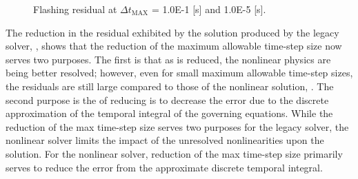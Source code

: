 \begin{figure}[h!t]
\centering
{}
\caption[Flashing residual at $\Delta t_{\text{MAX}}$ = 1.0E-1 {[s]}and 1.0E-5 {[s]}]{Flashing residual at $\Delta t_{\text{MAX}}$ = 1.0E-1 {[s]} and 1.0E-5 {[s]}.}
\label{fig:flashing_compare_2}
\end{figure}

The reduction in the residual exhibited by the solution produced by the legacy solver, , shows that the reduction of the maximum allowable time-step size now serves two purposes.
The first is that as \dtmax{} is reduced, the nonlinear physics are being better resolved; however, even for small maximum allowable time-step sizes, the residuals are still large compared to those of the nonlinear solution, .
The second purpose is the of reducing \dtmax{} is to decrease the error due to the discrete approximation of the temporal integral of the governing equations.
While the reduction of the max time-step size serves two purposes for the legacy solver, the nonlinear solver limits the impact of the unresolved nonlinearities upon the solution.
For the nonlinear solver, reduction of the max time-step size primarily serves to reduce the error from the approximate discrete temporal integral.

